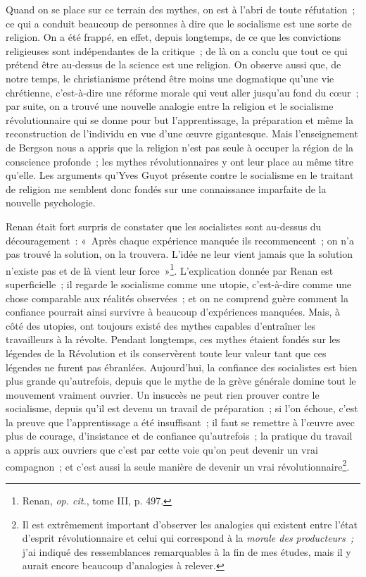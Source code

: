 \documentclass[french,twoside]{book} %
\begin{document}
Quand on se place sur ce terrain des mythes, on est à l’abri de toute réfutation ; ce qui a conduit beaucoup de personnes à dire que le socialisme est une sorte de religion. On a été frappé, en effet, depuis longtemps, de ce que les convictions religieuses sont indépendantes de la critique ; de là on a conclu que tout ce qui prétend être au-dessus de la science est une religion. On observe aussi que, de notre temps, le christianisme prétend être moins une dogmatique qu’une vie chrétienne, c’est-à-dire une réforme morale qui veut aller jusqu’au fond du cœur ; par suite, on a trouvé une nouvelle analogie entre la religion et le socialisme révolutionnaire qui se donne pour but l’apprentissage, la préparation et même la reconstruction de l’individu en vue d’une œuvre gigantesque. Mais l’enseignement de Bergson nous a appris que la religion n’est pas seule à occuper la région de la conscience profonde ; les mythes révolutionnaires y ont leur place au même titre qu’elle. Les arguments qu’Yves Guyot présente contre le socialisme en le traitant de religion me semblent donc fondés sur une connaissance imparfaite de la nouvelle psychologie.\par
 Renan était fort surpris de constater que les socialistes sont au-dessus du découragement : « Après chaque expérience manquée ils recommencent ; on n’a pas trouvé la solution, on la trouvera. L’idée ne leur vient jamais que la solution n’existe pas et de là vient leur force »\footnote{ \noindent Renan, \emph{op. cit.}, tome III, p. 497.
 }. L’explication donnée par Renan est superficielle ; il regarde le socialisme comme une utopie, c’est-à-dire comme une chose comparable aux réalités observées ; et on ne comprend guère comment la confiance pourrait ainsi survivre à beaucoup d’expériences manquées. Mais, à côté des utopies, ont toujours existé des mythes capables d’entraîner les travailleurs à la révolte. Pendant longtemps, ces mythes étaient fondés sur les légendes de la Révolution et ils conservèrent toute leur valeur tant que ces légendes ne furent pas ébranlées. Aujourd’hui, la confiance des socialistes est bien plus grande qu’autrefois, depuis que le mythe de la grève générale domine tout le mouvement vraiment ouvrier. Un insuccès ne peut rien prouver contre le socialisme, depuis qu’il est devenu un travail de préparation ; si l’on échoue, c’est la preuve que l’apprentissage a été insuffisant ; il faut se remettre à l’œuvre avec plus de courage, d’insistance et de confiance qu’autrefois ; la pratique du travail a appris aux ouvriers que c’est par cette voie qu’on peut devenir un vrai compagnon ; et c’est aussi la seule manière de devenir un vrai révolutionnaire\footnote{ \noindent Il est extrêmement important d’observer les analogies qui existent entre l’état d’esprit révolutionnaire et celui qui correspond à la \emph{morale des producteurs ;} j’ai indiqué des ressemblances remarquables à la fin de mes études, mais il y aurait encore beaucoup d’analogies à relever.
 }.
\end{document}
